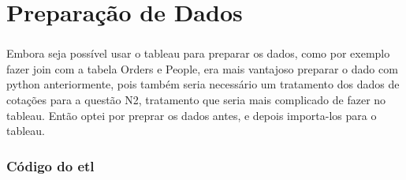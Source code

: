 \chapter{Preparação de Dados}

\subsection*{}
Embora seja possível usar o tableau para preparar os dados, como por exemplo fazer join com a tabela Orders e People, 
era mais vantajoso preparar o dado com python anteriormente, pois também seria necessário um tratamento dos dados de cotações para a questão N2,
tratamento que seria mais complicado de fazer no tableau.
Então optei por preprar os dados antes, e depois importa-los para o tableau.

\subsection*{Código do etl}

